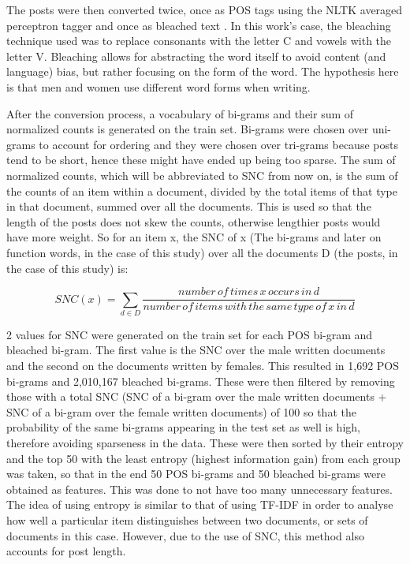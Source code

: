 The posts were then converted twice, once as POS tags using the NLTK averaged perceptron tagger \cite{nltk} and once as bleached text \cite{5}. In this work's case, the bleaching technique used was to replace consonants with the letter C and vowels with the letter V. Bleaching allows for abstracting the word itself to avoid content (and language) bias, but rather focusing on the form of the word. The hypothesis here is that men and women use different word forms when writing. 

After the conversion process, a vocabulary of bi-grams and their sum of normalized counts is generated on the train set. Bi-grams were chosen over uni-grams to account for ordering and they were chosen over tri-grams because posts tend to be short, hence these might have ended up being too sparse. The sum of normalized counts, which will be abbreviated to SNC from now on, is the sum of the counts of an item within a document, divided by the total items of that type in that document, summed over all the documents. This is used so that the length of the posts does not skew the counts, otherwise lengthier posts would have more weight. So for an item x, the SNC of x (The bi-grams and later on function words, in the case of this study) over all the documents D (the posts, in the case of this study) is: 

\[SNC(x) = \sum_{d \in D} \frac{number\, of\, times\, x\, occurs\, in\, d}{number\, of\, items\, with\, the\, same\, type\, of\, x\, in\, d}\]

2 values for SNC were generated on the train set for each POS bi-gram and bleached bi-gram. The first value is the SNC over the male written documents and the second on the documents written by females. This resulted in 1,692 POS bi-grams and 2,010,167 bleached bi-grams. These were then filtered by removing those with a total SNC (SNC of a bi-gram over the male written documents + SNC of a bi-gram over the female written documents) of 100 so that the probability of the same bi-grams appearing in the test set as well is high, therefore avoiding sparseness in the data. These were then sorted by their entropy and the top 50 with the least entropy (highest information gain) from each group was taken, so that in the end 50 POS bi-grams and 50 bleached bi-grams were obtained as features. This was done to not have too many unnecessary features. The idea of using entropy is similar to that of using TF-IDF in order to analyse how well a particular item distinguishes between two documents, or sets of documents in this case. However, due to the use of SNC, this method also accounts for post length.

